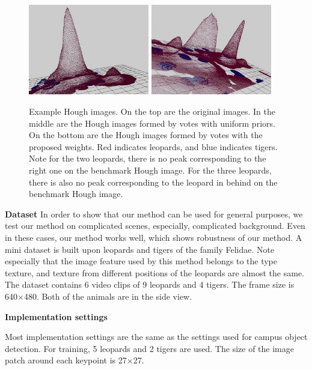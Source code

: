 \begin{figure}
\includegraphics[width=0.47\textwidth,bb=0 0 640 480]{2.jpg}
\includegraphics[width=0.47\textwidth,bb=0 0 640 480]{4.jpg}


\caption[Example Hough images]{Example Hough images. On the top are the original images. In the middle are the Hough images formed by votes with uniform priors. On the bottom are the Hough images formed by votes with the proposed weights. Red indicates leopards, and blue indicates tigers. Note for the two leopards, there is no peak corresponding to the right one on the benchmark Hough image. For the three leopards, there is also no peak corresponding to the leopard in behind on the benchmark Hough image.}
\label{fig:BcHi}
\end{figure}
\textbf{Dataset}
 In order to show that our method can be used for general purposes, we test our method on complicated scenes, especially, complicated background.  Even in these cases, our method works well, which shows robustness of our method. A mini dataset is built upon leopards and tigers of the family Felidae. Note especially that the image feature used by this method belongs to the type texture, and texture from different  positions of the leopards are almost the same. The dataset contains 6 video clips of 9 leopards and 4 tigers. The frame size is 640$\times$480. Both of the animals are in the side view.


\textbf{Implementation settings}

 Most implementation settings are the same as the settings used for campus object detection. For training, 5 leopards and 2 tigers are used. The size of the image patch around each keypoint is 27$\times$27.






